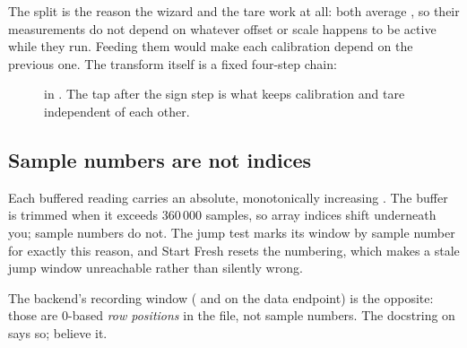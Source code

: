 \documentclass[11pt,a4paper]{article}
\begin{document}
The split is the reason the wizard and the tare work at all: both average
, so their measurements do not depend on whatever offset or
scale happens to be active while they run. Feeding them  would make
each calibration depend on the previous one. The transform itself is a fixed
four-step chain:

\begin{figure}[H]\centering
{}
\caption{ in . The tap after the
sign step is what keeps calibration and tare independent of each other.}
\end{figure}

\subsection{Sample numbers are not indices}

Each buffered reading carries an absolute, monotonically increasing
. The buffer is trimmed when it exceeds 360\,000 samples, so
array indices shift underneath you; sample numbers do not. The jump test marks
its window by sample number for exactly this reason, and \textsf{Start Fresh}
resets the numbering, which makes a stale jump window unreachable rather than
silently wrong.

The backend's recording window ( and  on the data
endpoint) is the opposite: those are 0-based \emph{row positions} in the file,
not sample numbers. The docstring on  says so;
believe it.
\end{document}
